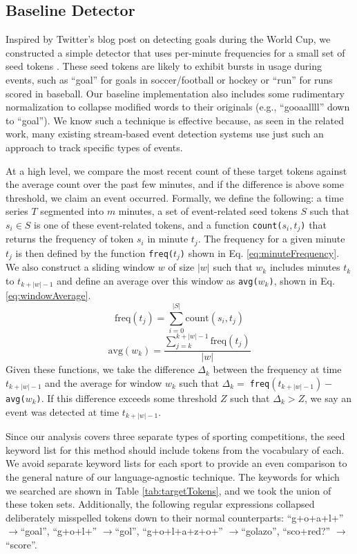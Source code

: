 \documentclass{sig-alternate}
\begin{document}
\subsection{Baseline Detector}

Inspired by Twitter's blog post on detecting goals during the World Cup, we constructed a simple detector that uses per-minute frequencies for a small set of seed tokens \cite{Cipriani2014}. 
These seed tokens are likely to exhibit bursts in usage during events, such as ``goal'' for goals in soccer/football or hockey or ``run'' for runs scored in baseball.
Our baseline implementation also includes some rudimentary normalization to collapse modified words to their originals (e.g., ``gooaallll'' down to ``goal'').
We know such a technique is effective because, as seen in the related work, many existing stream-based event detection systems use just such an approach to track specific types of events.

At a high level, we compare the most recent count of these target tokens against the average count over the past few minutes, and if the difference is above some threshold, we claim an event occurred.
Formally, we define the following: a time series $T$ segmented into $m$ minutes, a set of event-related seed tokens $S$ such that $s_i \in S$ is one of these event-related tokens, and a function \texttt{count($s_i, t_j$)} that returns the frequency of token $s_i$ in minute $t_j$.
The frequency for a given minute $t_j$ is then defined by the function \texttt{freq($t_j$)} shown in Eq. \ref{eq:minuteFrequency}.
We also construct a sliding window $w$ of size $|w|$ such that $w_k$ includes minutes $t_k$ to $t_{k+|w|-1}$ and define an average over this window as \texttt{avg($w_k$)}, shown in Eq. \ref{eq:windowAverage}.
%
\begin{equation}
\label{eq:minuteFrequency}
\text{freq}(t_j) = \sum_{i=0}^{|S|}\text{count}(s_i, t_j)
\end{equation}
\begin{equation}
\label{eq:windowAverage}
\text{avg}(w_k) = \frac{\sum_{j=k}^{k + |w| - 1}\text{freq}(t_j)}{|w|}
\end{equation}
%
Given these functions, we take the difference $\Delta_k$ between the frequency at time $t_{k+|w|-1}$ and the average for window $w_k$ such that $\Delta_k = \;$\texttt{freq}$(t_{k+|w|-1}) - $ \texttt{avg($w_k$)}.
If this difference exceeds some threshold $Z$ such that $\Delta_k > Z$, we say an event was detected at time $t_{k+|w|-1}$.

Since our analysis covers three separate types of sporting competitions, the seed keyword list for this method should include tokens from the vocabulary of each. 
We avoid separate keyword lists for each sport to provide an even comparison to the general nature of our language-agnostic technique.
The keywords for which we searched are shown in Table \ref{tab:targetTokens}, and we took the union of these token sets.
Additionally, the following regular expressions collapsed deliberately misspelled tokens down to their normal counterparts: ``g+o+a+l+'' $\rightarrow$``goal'', ``g+o+l+'' $\rightarrow$``gol'', ``g+o+l+a+z+o+'' $\rightarrow$``golazo'', ``sco+red?'' $\rightarrow$``score''.
\end{document}
